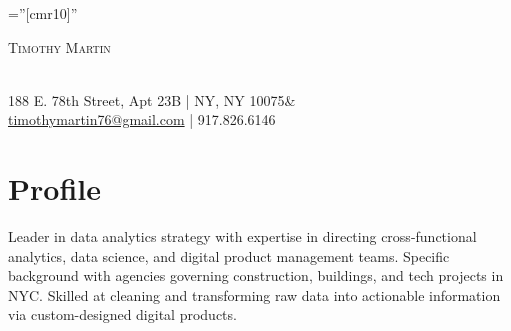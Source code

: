 \documentclass[a4paper,10pt]{article}
\begin{document}
\pagestyle{empty} %
\font\fb=''[cmr10]'' %


\par{\centering
		{\huge\textsc{Timothy} \textsc{Martin}
	}\par}
	
	\par{\centering
		{\footnotesize\\{188 E. 78th Street, Apt 23B | NY, NY 10075}& \\\href{mailto:timothymartin76@gmail.com}{timothymartin76@gmail.com} | 917.826.6146
	}\par}



\section{Profile}
\small {Leader in data analytics strategy with expertise in directing cross-functional analytics, data science, and digital product management teams. Specific background with agencies governing construction, buildings, and tech projects in NYC. Skilled at cleaning and transforming raw data into actionable information via custom-designed digital products.
} 
\end{document}
